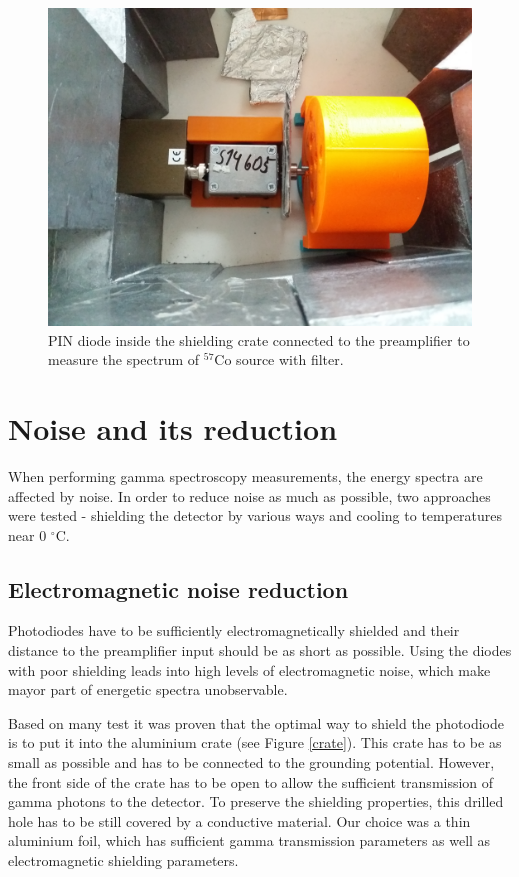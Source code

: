 \begin{figure}[H]
 \centering
 \includegraphics[scale=0.09, angle = 0]{./pictures/ORTECsetup.jpg}
 \caption{PIN diode inside the shielding crate connected to the preamplifier to measure the spectrum of $^{57}$Co source with filter.}
 \label{setup}
 
\end{figure}


\section{Noise and its reduction}
When performing gamma spectroscopy measurements, the energy spectra are affected by noise. In order to reduce noise as much as possible, two approaches were tested - shielding the detector by various ways and cooling to temperatures near 0  $^\circ$C.
\subsection{Electromagnetic noise reduction}
Photodiodes have to be sufficiently electromagnetically shielded and their distance to the preamplifier input should be as short as possible. Using the diodes with poor shielding leads into high levels of electromagnetic noise, which make mayor part of energetic spectra unobservable.
\par
Based on many test it was proven that  the optimal way to shield the photodiode is to put it into the aluminium crate (see Figure \ref{crate}). This crate has to be as small as possible and has to be connected to the grounding potential. However, the front side of the crate has to be open to allow the sufficient transmission of gamma photons to the detector. To preserve the shielding properties, this drilled hole has to be still covered by a conductive material. Our choice was a thin aluminium foil, which has sufficient gamma transmission parameters as well as electromagnetic shielding parameters.

